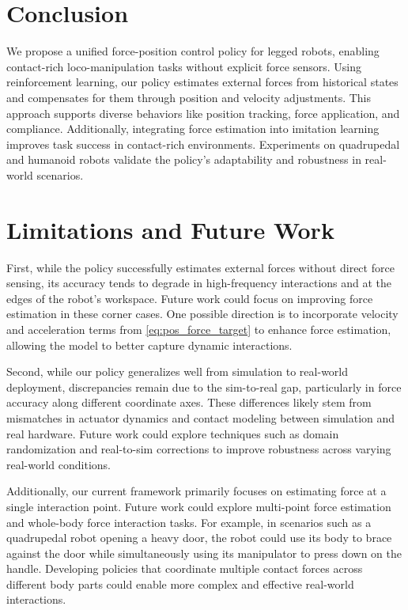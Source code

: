 \documentclass{article}
\begin{document}

\section{Conclusion}
\vspace{-0.05in}
We propose a unified force-position control policy for legged robots, enabling contact-rich loco-manipulation tasks without explicit force sensors. Using reinforcement learning, our policy estimates external forces from historical states and compensates for them through position and velocity adjustments. This approach supports diverse behaviors like position tracking, force application, and compliance. Additionally, integrating force estimation into imitation learning improves task success in contact-rich environments. Experiments on quadrupedal and humanoid robots validate the policy’s adaptability and robustness in real-world scenarios.

\clearpage

\section{Limitations and Future Work}


First, while the policy successfully estimates external forces without direct force sensing, its accuracy tends to degrade in high-frequency interactions and at the edges of the robot’s workspace. Future work could focus on improving force estimation in these corner cases. One possible direction is to incorporate velocity and acceleration terms from \cref{eq:pos_force_target} to enhance force estimation, allowing the model to better capture dynamic interactions.

Second, while our policy generalizes well from simulation to real-world deployment, discrepancies remain due to the sim-to-real gap, particularly in force accuracy along different coordinate axes. These differences likely stem from mismatches in actuator dynamics and contact modeling between simulation and real hardware. Future work could explore techniques such as domain randomization and real-to-sim corrections to improve robustness across varying real-world conditions.

Additionally, our current framework primarily focuses on estimating force at a single interaction point. Future work could explore multi-point force estimation and whole-body force interaction tasks. For example, in scenarios such as a quadrupedal robot opening a heavy door, the robot could use its body to brace against the door while simultaneously using its manipulator to press down on the handle. Developing policies that coordinate multiple contact forces across different body parts could enable more complex and effective real-world interactions.
\end{document}

